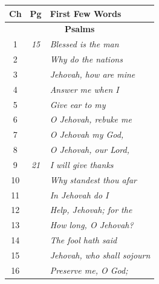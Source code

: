 \documentclass{article}
\newlength{\minipageheight}
\newlength{\minipagewidth}
\begin{document}
%
%
\begin{minipage}[r][\minipageheight][t]{\minipagewidth}%
    \begin{longtable}{ccl}
        \textbf{Ch} & \textbf{Pg} & \textbf{First Few Words}            \\%
        \hline%
        \endfirsthead%
        \multicolumn{3}{c}{\textbf{Psalms}}                             \\
        \hline
        1           & \textit{15} & \textit{Blessed is the man}         \\
        2           &             & \textit{Why do the nations}         \\
        3           &             & \textit{Jehovah, how are mine}      \\
        4           &             & \textit{Answer me when I}           \\
        5           &             & \textit{Give ear to my}             \\
        6           &             & \textit{O Jehovah, rebuke me}       \\
        7           &             & \textit{O Jehovah my God,}          \\
        8           &             & \textit{O Jehovah, our Lord,}       \\
        9           & \textit{21} & \textit{I will give thanks}         \\
        10          &             & \textit{Why standest thou afar}     \\
        11          &             & \textit{In Jehovah do I}            \\
        12          &             & \textit{Help, Jehovah; for the}     \\
        13          &             & \textit{How long, O Jehovah?}       \\
        14          &             & \textit{The fool hath said}         \\
        15          &             & \textit{Jehovah, who shall sojourn} \\
        16          &             & \textit{Preserve me, O God;}        \\

\end{longtable}
\end{minipage}
\end{document}
